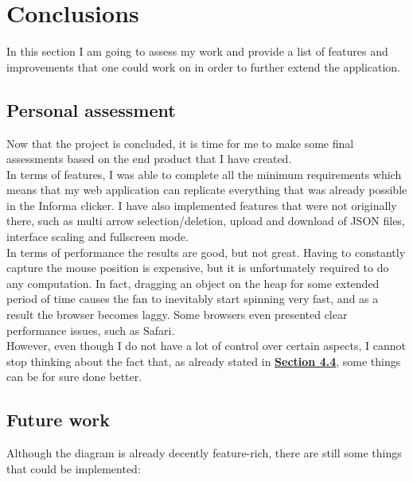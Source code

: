 \documentclass[]{usiinfbachelorproject}
\begin{document}
\vspace{\fill}

\pagebreak

\section{Conclusions} \label{Conclusions}

In this section I am going to assess my work and provide a list of features and improvements that one could work on in order to further extend the application.

\subsection{Personal assessment}

Now that the project is concluded, it is time for me to make some final assessments based on the end product that I have created. \\
In terms of features, I was able to complete all the minimum requirements which means that my web application can replicate everything that was already possible in the Informa clicker. I have also implemented features that were not originally there, such as multi arrow selection/deletion, upload and download of JSON files, interface scaling and fullscreen mode.\\
In terms of performance the results are good, but not great. Having to constantly capture the mouse position is expensive, but it is unfortunately required to do any computation. In fact, dragging an object on the heap for some extended period of time causes the fan to inevitably start spinning very fast, and as a result the browser becomes laggy. Some browsers even presented clear performance issues, such as Safari.\\However, even though I do not have a lot of control over certain aspects, I cannot stop thinking about the fact that, as already stated in \hyperref[storing states]{\textbf{Section 4.4}}, some things can be for sure done better.

\subsection{Future work}

Although the diagram is already decently feature-rich, there are still some things that could be implemented:
\end{document}
